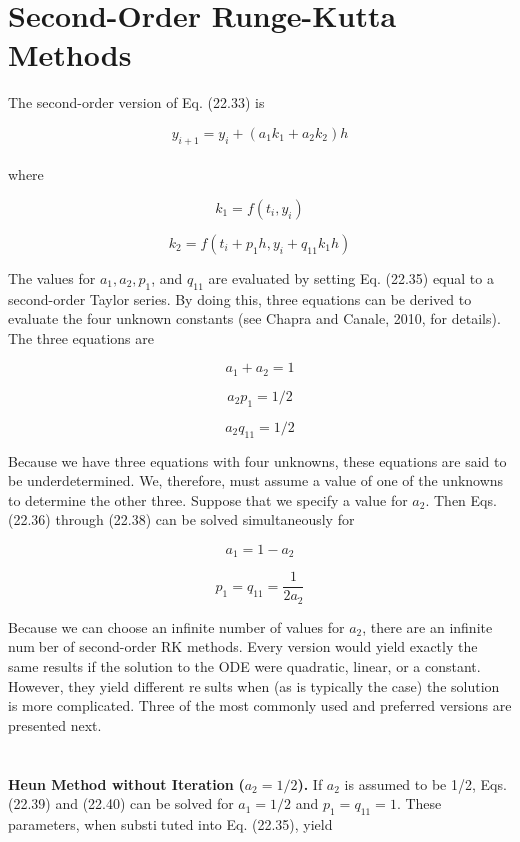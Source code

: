 \section{Second-Order Runge-Kutta Methods}

The second-order version of Eq. (22.33) is

\begin{equation}
\tag{22.35}
y_{i+1} = y_{i} + (a_1 k_1 + a_2k_2)h
\end{equation}\\
where

\begin{equation}
\tag{22.35a}
k_1 = f(t_{i}, y_{i})
\end{equation}

\begin{equation}
\tag{22.35b}
k_2 = f(t_{i} + p_1 h, y_{i} + q_{11} k_1 h )
\end{equation}

The values for $a_{1},a_{2},p_{1}$, and $q_{11}$ are evaluated by setting Eq. (22.35) equal to a
second-order Taylor series. By doing this, three equations can be derived to evaluate the
four unknown constants (see Chapra and Canale, 2010, for details). The three equations are

\begin{equation}
\tag{22.36}
a_{1} + a_{2} = 1
\end{equation}

\begin{equation}
\tag{22.37}
a_{2}p_{1} = 1/2
\end{equation}

\begin{equation}
\tag{22.38}
a_{2}q_{11} = 1/2
\end{equation}

Because we have three equations with four unknowns, these equations are said to be
underdetermined. We, therefore, must assume a value of one of the unknowns to determine
the other three. Suppose that we specify a value for $a_{2}$. Then Eqs. (22.36) through (22.38)
can be solved simultaneously for

\begin{equation}
\tag{22.39}
a_{1} = 1 - a_{2}
\end{equation}

\begin{equation}
\tag{22.40}
p_{1} = q_{11} = \dfrac{1}{2a_{2}}
\end{equation}

Because we can choose an infinite number of values for $a_{2}$, there are an infinite number of second-order RK methods. Every version would yield exactly the same results if the
solution to the ODE were quadratic, linear, or a constant. However, they yield different results when (as is typically the case) the solution is more complicated. Three of the most
commonly used and preferred versions are presented next.\\
\\
\\
\textbf{Heun Method without Iteration} \textbf{($a_{2} = 1/2$).} If $a_{2}$ is assumed to be 1/2, Eqs. (22.39)
and (22.40) can be solved for $a_{1} = 1/2$ and $p_{1} = q_{11} = 1$. These parameters, when substituted into Eq. (22.35), yield

